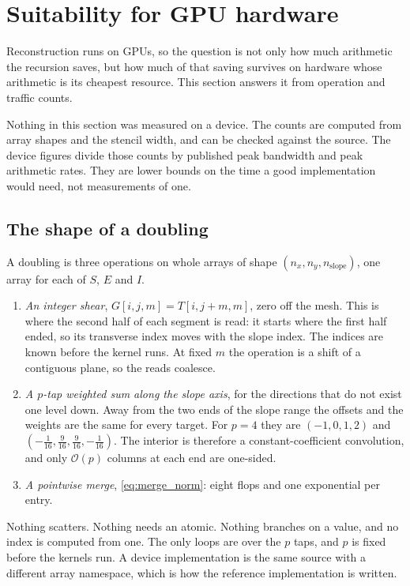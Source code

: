 \documentclass[11pt]{article}
\newcommand{\bigO}{\mathcal{O}}
\begin{document}
\section{Suitability for GPU hardware}
\label{sec:gpu}

Reconstruction runs on GPUs, so the question is not only how much arithmetic
the recursion saves, but how much of that saving survives on hardware whose
arithmetic is its cheapest resource. This section answers it from operation
and traffic counts.

Nothing in this section was measured on a device. The counts are computed from
array shapes and the stencil width, and can be checked against the source. The
device figures divide those counts by published peak bandwidth and peak
arithmetic rates. They are lower bounds on the time a good implementation
would need, not measurements of one.

\subsection{The shape of a doubling}

A doubling is three operations on whole arrays of shape
$(n_x, n_y, n_{\mathrm{slope}})$, one array for each of $S$, $E$ and $I$.
\begin{enumerate}
\item \emph{An integer shear}, $G[i,j,m] = T[i,j+m,m]$, zero off the mesh.
  This is where the second half of each segment is read: it starts where the
  first half ended, so its transverse index moves with the slope index. The
  indices are known before the kernel runs. At fixed $m$ the operation is a
  shift of a contiguous plane, so the reads coalesce.
\item \emph{A $p$-tap weighted sum along the slope axis}, for the directions
  that do not exist one level down. Away from the two ends of the slope range
  the offsets and the weights are the same for every target. For $p=4$ they
  are $(-1,0,1,2)$ and
  $(-\tfrac{1}{16}, \tfrac{9}{16}, \tfrac{9}{16}, -\tfrac{1}{16})$. The
  interior is therefore a constant-coefficient convolution, and only
  $\bigO(p)$ columns at each end are one-sided.
\item \emph{A pointwise merge}, \eqref{eq:merge_norm}: eight flops and one
  exponential per entry.
\end{enumerate}
Nothing scatters. Nothing needs an atomic. Nothing branches on a value, and no
index is computed from one. The only loops are over the $p$ taps, and $p$ is
fixed before the kernels run. A device implementation is the same source with a
different array namespace, which is how the reference implementation is
written.
\end{document}
